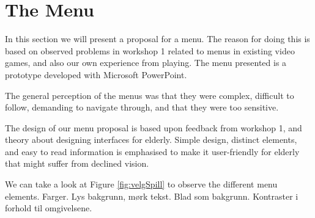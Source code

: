 \section{The Menu}

In this section we will present a proposal for a menu. The reason for doing this is based on observed problems in workshop 1 related to menus in existing video games, and also our own experience from playing. The menu presented is a prototype developed with Microsoft PowerPoint.

The general perception of the menus was that they were complex, difficult to follow, demanding to navigate through, and that they were too sensitive. 

The design of our menu proposal is based upon feedback from workshop 1, and theory about designing interfaces for elderly. Simple design, distinct elements, and easy to read information is emphasised to make it user-friendly for elderly that might suffer from declined vision. 

We can take a look at Figure \ref{fig:velgSpill} to observe the different menu elements. 
Farger.
Lys bakgrunn, mørk tekst.
Blad som bakgrunn.
Kontraster i forhold til omgivelsene. 

